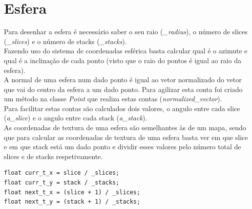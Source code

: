 \documentclass[a4paper]{report}
\begin{document}
\section{Esfera}
Para desenhar a esfera é necessário saber o seu raio (\textit{\_radius}), o
número de slices (\textit{\_slices}) e o número de stacks (\textit{\_stacks}).\\
Fazendo uso do sistema de coordenadas esférica basta calcular qual é o azimute e
qual é a inclinação de cada ponto (visto que o raio do pontos é igual ao raio da
esfera).\\
A normal de uma esfera num dado ponto é igual ao vetor normalizado do vetor que
vai do centro da esfera a um dado ponto. Para agilizar esta conta foi criado um
método na classe \textit{Point} que realiza estas contas
(\textit{normalized\_vector}).\\
Para facilitar estas contas são calculados dois valores, o angulo entre cada
slice (\textit{a\_slice}) e o angulo entre cada stack (\textit{a\_stack}).\\
As coordenadas de textura de uma esfera são semelhantes às de um mapa, sendo que
para calcular as coordenadas de textura de uma esfera basta ver em que slice e
em que stack está um dado ponto e dividir esses valores pelo número total de
slices e de stacks respetivamente.

\begin{lstlisting}
float curr_t_x = slice / _slices;
float curr_t_y = stack / _stacks;
float next_t_x = (slice + 1) / _slices;
float next_t_y = (stack + 1) / _stacks;
\end{lstlisting}
\end{document}
